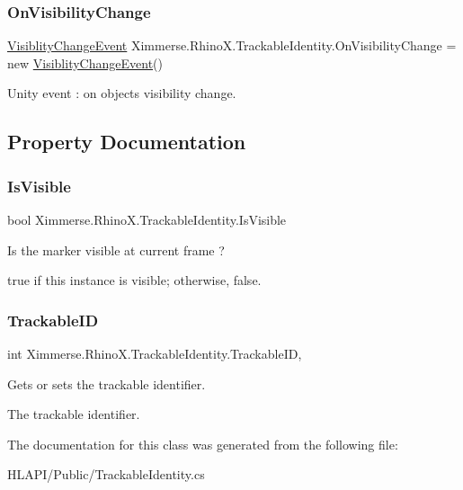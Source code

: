 \subsubsection{\texorpdfstring{On\+Visibility\+Change}{OnVisibilityChange}}
{\footnotesize\ttfamily \mbox{\hyperlink{class_ximmerse_1_1_rhino_x_1_1_visiblity_change_event}{Visiblity\+Change\+Event}} Ximmerse.\+Rhino\+X.\+Trackable\+Identity.\+On\+Visibility\+Change = new \mbox{\hyperlink{class_ximmerse_1_1_rhino_x_1_1_visiblity_change_event}{Visiblity\+Change\+Event}}()}



Unity event \+: on object\textquotesingle{}s visibility change. 



\subsection{Property Documentation}
\mbox{\label{class_ximmerse_1_1_rhino_x_1_1_trackable_identity_a6265ce8a7d68c19fef42587c574a6981}} 
\subsubsection{\texorpdfstring{Is\+Visible}{IsVisible}}
{\footnotesize\ttfamily bool Ximmerse.\+Rhino\+X.\+Trackable\+Identity.\+Is\+Visible\hspace{0.3cm}{\ttfamily [get]}}



Is the marker visible at current frame ? 

{\ttfamily true} if this instance is visible; otherwise, {\ttfamily false}.\mbox{\label{class_ximmerse_1_1_rhino_x_1_1_trackable_identity_a271412a107c63cfd093732698616f331}} 
\subsubsection{\texorpdfstring{Trackable\+ID}{TrackableID}}
{\footnotesize\ttfamily int Ximmerse.\+Rhino\+X.\+Trackable\+Identity.\+Trackable\+ID\hspace{0.3cm}{\ttfamily [get]}, {\ttfamily [set]}}



Gets or sets the trackable identifier. 

The trackable identifier.

The documentation for this class was generated from the following file\+:\begin{DoxyCompactItemize}
\item 
H\+L\+A\+P\+I/\+Public/Trackable\+Identity.\+cs\end{DoxyCompactItemize}
